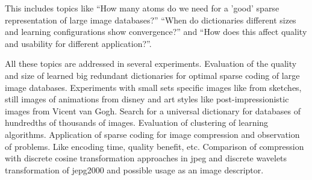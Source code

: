 This includes topics like ``How many atoms do we need  for a 'good' sparse representation of large image databases?'' 
``When do dictionaries different sizes and learning configurations show convergence?'' and ``How does this affect quality and usability for different application?''. 

All these topics are addressed in several experiments.
Evaluation of the quality and size of learned big redundant dictionaries for optimal sparse coding of large image databases.
Experiments with small sets specific images like from sketches, still images of animations from disney and art styles like post-impressionistic images from Vicent van Gogh.
Search for a universal dictionary for databases of hundredths of thousands of images.
Evaluation of clustering of learning algorithms. 
Application of sparse coding for image compression and observation of problems. Like encoding time, quality benefit, etc.
Comparison of compression with discrete cosine transformation approaches in jpeg and discrete wavelets transformation of jepg2000 and possible usage as an image descriptor.







